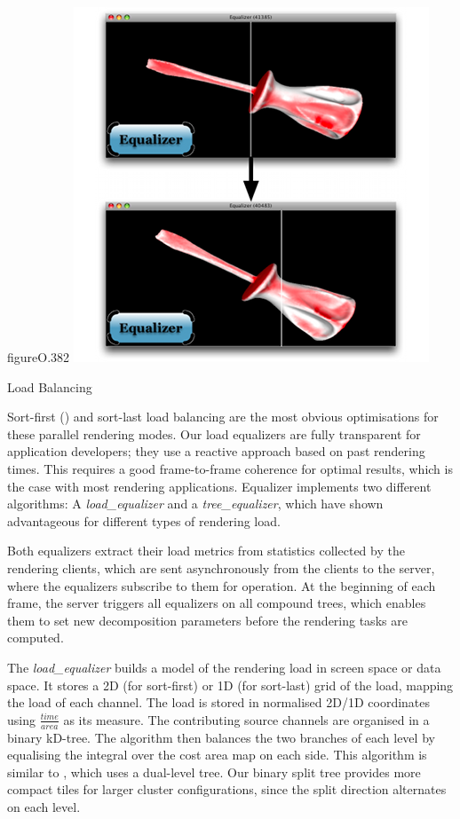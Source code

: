 \begin{wrapfloat}{figure}{O}{.382\textwidth}
  \includegraphics[width=.382\textwidth]{images/loadeq}
  \caption{\label{floadeq}Load Balancing}
\end{wrapfloat}

Sort-first () and sort-last load balancing are the most obvious
optimisations for these parallel rendering modes. Our load equalizers are fully
transparent for application developers; they use a reactive approach
based on past rendering times. This requires a good frame-to-frame
coherence for optimal results, which is the case with most rendering applications.
Equalizer implements two different algorithms: A {\em load\_equalizer} and a
{\em tree\_equalizer}, which have shown advantageous
for different types of rendering load.

Both equalizers extract their load metrics from statistics collected by the
rendering clients, which are sent asynchronously from the clients to the
server, where the equalizers subscribe to them for operation. At the beginning
of each frame, the server triggers all equalizers on all compound trees, which
enables them to set new decomposition parameters before the rendering tasks are
computed.

The {\em load\_equalizer} builds a model of the rendering load in screen space
or data space. It stores a 2D (for sort-first) or 1D (for sort-last) grid of
the load, mapping the load of each channel. The load is stored in normalised
2D/1D coordinates using $\frac{time}{area}$ as its measure. The contributing
source channels are organised in a binary kD-tree.  The algorithm then
balances the two branches of each level by equalising the integral over the
cost area map on each side. This algorithm is similar to \cite{ACCC:04}, which
uses a dual-level tree. Our binary split tree provides more compact tiles for
larger cluster configurations, since the split direction alternates on each
level.


